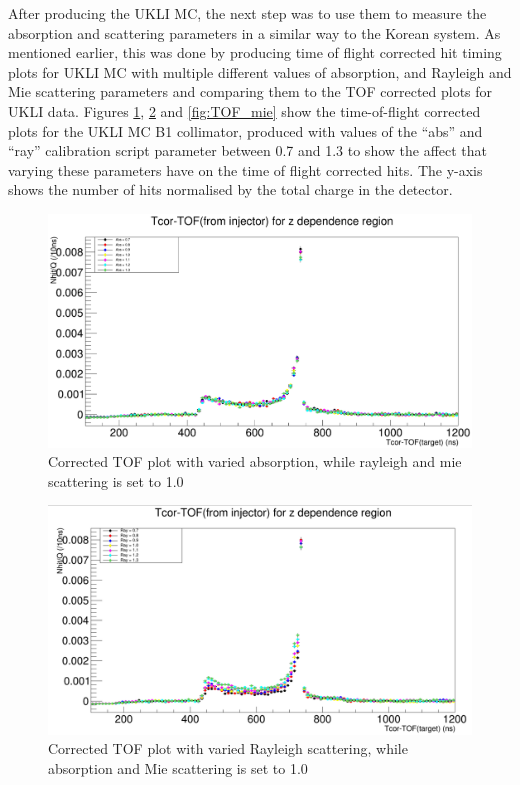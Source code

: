 After producing the UKLI MC, the next step was to use them to measure the absorption and scattering parameters in a similar way to the Korean system. As mentioned earlier, this was done by producing time of flight corrected hit timing plots for UKLI MC with multiple different values of absorption, and Rayleigh and Mie scattering parameters and comparing them to the TOF corrected plots for UKLI data. Figures \ref{fig:TOF_abs}, \ref{fig:TOF_ray} and \ref{fig:TOF_mie} show the time-of-flight corrected plots for the UKLI MC B1 collimator, produced with values of the ``abs'' and ``ray'' calibration script parameter between 0.7 and 1.3 to show the affect that varying these parameters have on the time of flight corrected hits. The y-axis shows the number of hits normalised by the total charge in the detector.

\begin{figure}
    \centering
    \includegraphics[width=\textwidth]{Figures/TOF_abs.PNG}
    \caption{Corrected TOF plot with varied absorption, while rayleigh and mie scattering is set to 1.0}
    \label{fig:TOF_abs}
\end{figure}

\begin{figure}
    \centering
    \includegraphics[width=\textwidth]{Figures/TOF_ray.PNG}
    \caption{Corrected TOF plot with varied Rayleigh scattering, while absorption and Mie scattering is set to 1.0}
    \label{fig:TOF_ray}
\end{figure}

